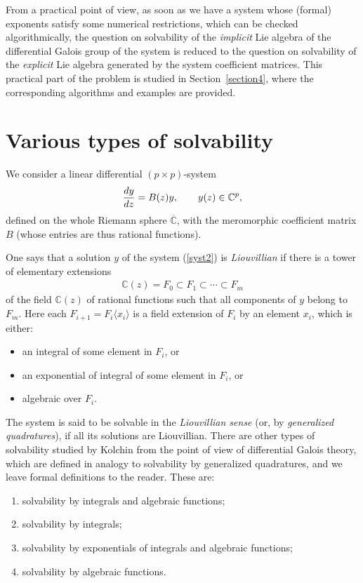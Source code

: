 \documentclass[11pt]{article}
\numberwithin{equation}{section}
\begin{document}
From a practical point of view, as soon as we have a system whose (formal) exponents satisfy some numerical restrictions, which can be checked algorithmically, the question on solvability of the {\it implicit} Lie algebra of the differential Galois group of the system is reduced to the question on solvability of the {\it explicit} Lie algebra generated by the system coefficient matrices. This practical part of the problem is studied in Section~\ref{section4}, where the corresponding algorithms and examples are provided.

\section{Various types of solvability}\label{section2}

We consider a linear differential $(p\times p)$-system
\begin{gather}\label{syst2}
\frac{{\rm d}y}{{\rm d}z}=B(z) y,\qquad y(z)\in{\mathbb C}^p,
\end{gather}
defined on the whole Riemann sphere $\overline{\mathbb C}$, with the meromorphic coefficient matrix $B$ (whose entries are
thus rational functions).

One says that a solution $y$ of the system (\ref{syst2}) is {\it Liouvillian} if there is a tower of elementary
extensions
\begin{gather*}
{\mathbb C}(z)=F_0\subset F_1\subset\cdots\subset F_m
\end{gather*}
of the field ${\mathbb C}(z)$ of rational functions such that all components of $y$ belong to $F_m$. Here each
$F_{i+1}=F_i\langle x_i\rangle$ is a field extension of $F_i$ by an element $x_i$, which is either:
\begin{itemize}	\itemsep=0pt
	\item[--] an integral of some element in $F_i$, or
	\item[--] an exponential of integral of some element in $F_i$, or
	\item[--] algebraic over $F_i$.
\end{itemize}
The system is said to be solvable in the {\it Liouvillian sense} (or, by {\it generalized quadratures}),
if all its solutions are Liouvillian. There are other types of solvability studied by Kolchin \cite{Ko} from the point of
view of differential Galois theory, which are defined in analogy to solvability by generalized quadratures, and we leave
formal definitions to the reader. These are:
\begin{enumerate}	\itemsep=0pt
	\item[1)] solvability by integrals and algebraic functions;
	\item[2)] solvability by integrals;
	\item[3)] solvability by exponentials of integrals and algebraic functions;
	\item[4)] solvability by algebraic functions.
\end{enumerate}
\end{document}
